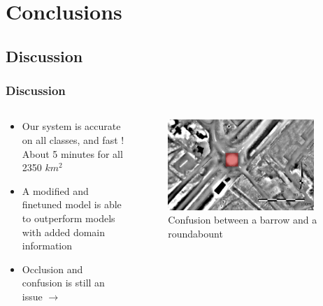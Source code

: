 \documentclass[aspectratio=169]{beamer}
\begin{document}
\section{Conclusions}
\subsection{Discussion}
\begin{frame}
	\frametitle{Discussion}

	\begin{columns}[T] %
		\begin{column}{.48\textwidth}
		\begin{itemize}
			\item Our system is accurate on all classes, and fast ! About 5 minutes for all 2350 $km^2$
			\item A modified and finetuned model is able to outperform models with added domain information
			\item Occlusion and confusion is still an issue $\rightarrow$
		\end{itemize}
		\end{column}
		\begin{column}{.48\textwidth}
		
		\begin{figure}
		  \centering
			\includegraphics[width=0.9\textwidth]{wrongBarrow}
			\caption{Confusion between a barrow and a roundabount}
		  \label{}
		\end{figure}
		\end{column}
		\end{columns}
\end{frame}
\end{document}
